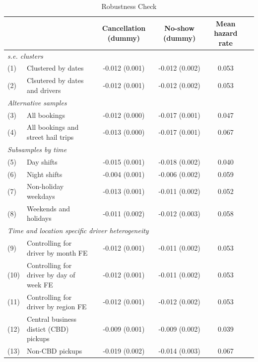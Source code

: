 \documentclass[reviewmode,AEJ]{AEA}
\begin{document}
\begin{appendices}
\begin{table}[]
    \centering
    \footnotesize
    \caption{Robustness Check}
    \def\sym#1{}%
    \begin{tabularx}{\textwidth}{ll@{\extracolsep{\fill}}*{4}{c}}
    	\toprule
    	\toprule
    	&      & Cancellation (dummy) & No-show (dummy) & Mean hazard rate \\
    	\midrule
    	\multicolumn{5}{l}{\textit{s.e. clusters}} \\
    	(1)  & Clustered by dates & -0.012\sym{***} (0.001) & -0.012\sym{***} (0.002) & 0.053 \\
    	(2)  & Clsutered by dates and drivers & -0.012\sym{***} (0.001) & -0.012\sym{***} (0.002) & 0.053 \\
    	\midrule
    	\multicolumn{5}{l}{\textit{Alternative samples}} \\
    	(3)  & All bookings & -0.012\sym{***} (0.000) & -0.017\sym{***} (0.001) & 0.047 \\
    	(4)  & All bookings and street hail trips & -0.013\sym{***} (0.000) & -0.017\sym{***} (0.001) & 0.067 \\
    	\midrule
    	\multicolumn{5}{l}{\textit{Subsamples by time}} \\
    	(5)  & Day shifts & -0.015\sym{***} (0.001) & -0.018\sym{***} (0.002) & 0.040 \\
    	(6)  & Night shifts & -0.004\sym{***} (0.001) & -0.006\sym{***} (0.002) & 0.059 \\
    	(7)  & Non-holiday weekdays & -0.013\sym{***} (0.001) & -0.011\sym{***} (0.002) & 0.052 \\
    	(8)  & Weekends and holidays & -0.011\sym{***} (0.002) & -0.012\sym{***} (0.003) & 0.058 \\
    	\midrule
    	\multicolumn{5}{l}{\textit{Time and location specific driver heterogeneity }} \\
    	(9)  & Controlling for driver by month FE & -0.012\sym{***} (0.001) & -0.011\sym{***} (0.002) & 0.053 \\
    	(10) & Controlling for driver by day of week FE & -0.012\sym{***} (0.001) & -0.011\sym{***} (0.002) & 0.053 \\
    	(11) & Controlling for driver by region FE & -0.012\sym{***} (0.001) & -0.012\sym{***} (0.002) & 0.053 \\
    	(12) & Central business distict (CBD) pickups & -0.009\sym{***} (0.001) & -0.009\sym{***} (0.002) & 0.039 \\
    	(13) & Non-CBD pickups & -0.019\sym{***} (0.002) & -0.014\sym{***} (0.003) & 0.067 \\

\end{tabularx}
\end{table}
\end{appendices}
\end{document}
